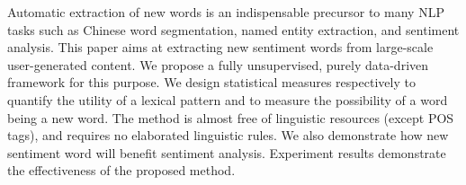 Automatic extraction of new words is an indispensable precursor to many NLP tasks such as Chinese word segmentation, named entity extraction, and sentiment analysis. This paper aims at extracting new sentiment words from large-scale user-generated content. We propose a fully unsupervised, purely data-driven framework for this purpose. We design statistical measures respectively to quantify the utility of a lexical pattern and to measure the possibility of a word being a new word. The method is almost free of linguistic resources (except POS tags), and requires no elaborated linguistic rules. We also demonstrate how new sentiment word will benefit sentiment analysis. Experiment results demonstrate the effectiveness of the proposed method.
